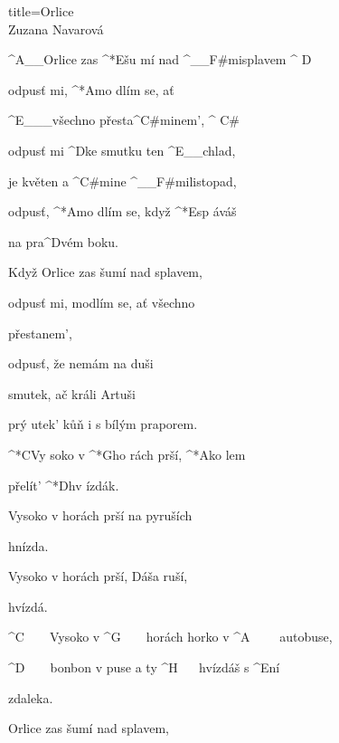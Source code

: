 \begin{song}{title=\predtitle\centering Orlice \\\large Zuzana Navarová  \vspace*{-0.3cm}}  %
\begin{centerjustified}

\begin{varwidth}[t]{0.48\textwidth}\setlength{\parindent}{\pindent}  %
\sloka
	^{A{\color{white}\_\_}}Orlice zas ^*{E}šu mí nad ^{{\color{white}\_\_}F#mi}splavem ^{\,\,D} 
	
	odpusť mi, ^*{A}mo dlím se, ať 

	^{E{\color{white}\_\_\_}}všechno přesta^{C#mi}nem', ^{\,\,C#}
	
	odpusť mi ^{D}ke smutku ten ^{E{\color{white}\_\_}}chlad,
	
	je květen a ^{C#mi}ne ^{{\color{white}\_\_}F#mi}listopad, 
	
	odpusť, ^*{A}mo dlím se, když ^*{E}sp áváš 

	na pra^{D}vém boku. 
	
\sloka
	Když Orlice zas šumí nad splavem, 
	
	odpusť mi, modlím se, ať všechno 

	přestanem',
	
	odpusť, že nemám na duši
	
	smutek, ač králi Artuši 
	
	prý utek' kůň i s bílým praporem.
	
	^*{C}Vy soko v ^*{G}ho rách prší, ^*{A}ko lem 

	přelít' ^*{D}hv ízdák. 
	
	Vysoko v horách prší na pyruších 

	hnízda. 
	
	Vysoko v horách prší, Dáša ruší, 

	hvízdá. 
	
	^{C\,\,\,\,\,\,\,\,\,\,\,\,}Vysoko v ^{G\,\,\,\,\,\,\,\,\,\,\,\,}horách 
	horko v ^{A\,\,\,\,\,\,\,\,\,\,\,\,\,\,}autobuse, 

	^{D\,\,\,\,\,\,\,\,\,\,\,\,}bonbon v puse
	a ty ^{H\,\,\,\,\,\,\,\,\,\,}hvízdáš s ^{E}ní 

	zdaleka. 

\end{varwidth}\mezisloupci\begin{varwidth}[t]{0.5\textwidth}\setlength{\parindent}{\pindent}
\vspace*{0.4425cm}
\sloka
	Orlice zas šumí nad splavem,


\end{varwidth}
\end{centerjustified}
\end{song}
